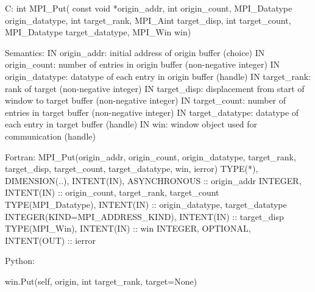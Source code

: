 C:
int MPI_Put(
  const void *origin_addr, int origin_count, MPI_Datatype origin_datatype,
  int target_rank, MPI_Aint target_disp, int target_count, MPI_Datatype target_datatype,
  MPI_Win win)

Semantics:
IN origin_addr: initial address of origin buffer (choice)
IN origin_count: number of entries in origin buffer (non-negative integer)
IN origin_datatype: datatype of each entry in origin buffer (handle)
IN target_rank: rank of target (non-negative integer)
IN target_disp: displacement from start of window to target buffer (non-negative integer)
IN target_count: number of entries in target buffer (non-negative integer)
IN target_datatype: datatype of each entry in target buffer (handle)
IN win: window object used for communication (handle)

Fortran:
MPI_Put(origin_addr, origin_count, origin_datatype,
  target_rank, target_disp, target_count, target_datatype, win, ierror)
TYPE(*), DIMENSION(..), INTENT(IN), ASYNCHRONOUS :: origin_addr
INTEGER, INTENT(IN) :: origin_count, target_rank, target_count
TYPE(MPI_Datatype), INTENT(IN) :: origin_datatype, target_datatype
INTEGER(KIND=MPI_ADDRESS_KIND), INTENT(IN) :: target_disp
TYPE(MPI_Win), INTENT(IN) :: win
INTEGER, OPTIONAL, INTENT(OUT) :: ierror

Python:

win.Put(self, origin, int target_rank, target=None)
